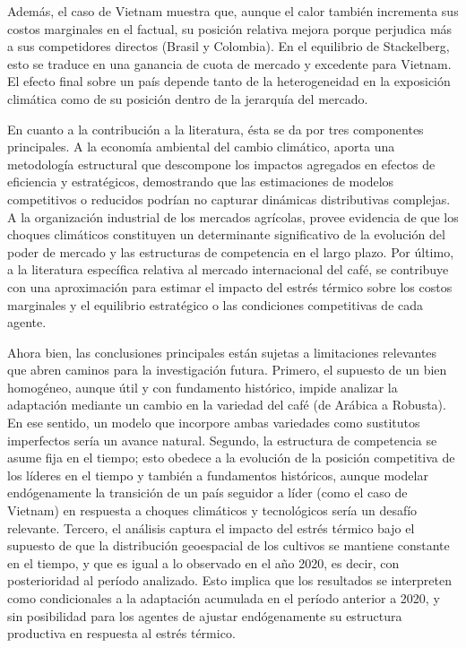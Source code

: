 Además, el caso de Vietnam muestra que, aunque el calor también incrementa sus costos marginales en el factual, su posición relativa mejora porque perjudica más a sus competidores directos (Brasil y Colombia). En el equilibrio de Stackelberg, esto se traduce en una ganancia de cuota de mercado y excedente para Vietnam. El efecto final sobre un país depende tanto de la heterogeneidad en la exposición climática como de su posición dentro de la jerarquía del mercado.

En cuanto a la contribución a la literatura, ésta se da por tres componentes principales. A la economía ambiental del cambio climático, aporta una metodología estructural que descompone los impactos agregados en efectos de eficiencia y estratégicos, demostrando que las estimaciones de modelos competitivos o reducidos podrían no capturar dinámicas distributivas complejas. A la organización industrial de los mercados agrícolas, provee evidencia de que los choques climáticos constituyen un determinante significativo de la evolución del poder de mercado y las estructuras de competencia en el largo plazo. Por último, a la literatura específica relativa al mercado internacional del café, se contribuye con una aproximación para estimar el impacto del estrés térmico sobre los costos marginales y el equilibrio estratégico o las condiciones competitivas de cada agente.

Ahora bien, las conclusiones principales están sujetas a limitaciones relevantes que abren caminos para la investigación futura. Primero, el supuesto de un bien homogéneo, aunque útil y con fundamento histórico, impide analizar la adaptación mediante un cambio en la variedad del café (de Arábica a Robusta). En ese sentido, un modelo que incorpore ambas variedades como sustitutos imperfectos sería un avance natural. Segundo, la estructura de competencia se asume fija en el tiempo; esto obedece a la evolución de la posición competitiva de los líderes en el tiempo y también a fundamentos históricos, aunque modelar endógenamente la transición de un país seguidor a líder (como el caso de Vietnam) en respuesta a choques climáticos y tecnológicos sería un desafío relevante. Tercero, el análisis captura el impacto del estrés térmico bajo el supuesto de que la distribución geoespacial de los cultivos se mantiene constante en el tiempo, y que es igual a lo observado en el año 2020, es decir, con posterioridad al período analizado. Esto implica que los resultados se interpreten como condicionales a la adaptación acumulada en el período anterior a 2020, y sin posibilidad para los agentes de ajustar endógenamente su estructura productiva en respuesta al estrés térmico.

